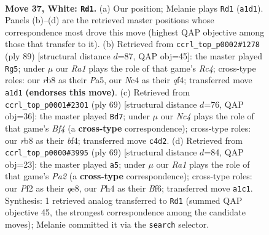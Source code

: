 \documentclass[11pt]{article}
\begin{document}
\clearpage

\begin{figure}[p]\centering
\begin{subfigure}{0.46\textwidth}\centering
\resizebox{\linewidth}{!}{%
\newchessgame
\chessboard[
  setfen={1r4k1/1r5p/1p6/p7/2NQ3P/8/PP3PP1/R4K2 w - - 11 37},
  showmover=false,
  pgfstyle=straightmove, color=movearrow, markmove={a1-d1}
]}
\caption{}
\end{subfigure}\hfill
\begin{subfigure}{0.46\textwidth}\centering
\resizebox{\linewidth}{!}{%
\newchessgame
\chessboard[
  setfen={6k1/5p2/2p3qp/p1r5/5Q2/1P3R1P/P5P1/7K b - - 21 45},
  showmover=false,
  pgfstyle=straightmove, color=movearrow, markmove={c5-g5}
]}
\caption{}
\end{subfigure}
\\[4pt]
\begin{subfigure}{0.46\textwidth}\centering
\resizebox{\linewidth}{!}{%
\newchessgame
\chessboard[
  setfen={8/1p4pk/6p1/pq3b2/5B2/4R2P/1P3RPK/8 b - - 3 35},
  showmover=false,
  pgfstyle=straightmove, color=movearrow, markmove={f5-d7}
]}
\caption{}
\end{subfigure}\hfill
\begin{subfigure}{0.46\textwidth}\centering
\resizebox{\linewidth}{!}{%
\newchessgame
\chessboard[
  setfen={4Q3/p4p1k/5bpp/8/P7/8/q4rPP/2R3RK b - - 0 35},
  showmover=false,
  pgfstyle=straightmove, color=movearrow, markmove={a7-a5}
]}
\caption{}
\end{subfigure}
\caption{\textbf{Move 37, White: \texttt{Rd1}.} (a) Our position; Melanie plays \texttt{Rd1} (\texttt{a1d1}). Panels (b)--(d) are the retrieved master positions whose correspondence most drove this move (highest QAP objective among those that transfer to it). (b) Retrieved from \texttt{ccrl\_top\_p0002\#1278} (ply 89) [structural distance $d$=87, QAP obj=45]: the master played \texttt{Rg5}; under $\mu$ our \emph{Ra1} plays the role of that game's \emph{Rc4}; cross-type roles: our \emph{r}b8 as their \emph{P}a5, our \emph{N}c4 as their \emph{q}f4; transferred move \texttt{a1d1} \textbf{(endorses this move)}. (c) Retrieved from \texttt{ccrl\_top\_p0001\#2301} (ply 69) [structural distance $d$=76, QAP obj=36]: the master played \texttt{Bd7}; under $\mu$ our \emph{Nc4} plays the role of that game's \emph{Bf4} (a \textbf{cross-type} correspondence); cross-type roles: our \emph{r}b8 as their \emph{b}f4; transferred move \texttt{c4d2}. (d) Retrieved from \texttt{ccrl\_top\_p0000\#3995} (ply 69) [structural distance $d$=84, QAP obj=23]: the master played \texttt{a5}; under $\mu$ our \emph{Ra1} plays the role of that game's \emph{Pa2} (a \textbf{cross-type} correspondence); cross-type roles: our \emph{P}f2 as their \emph{q}e8, our \emph{P}h4 as their \emph{B}f6; transferred move \texttt{a1c1}. Synthesis: 1 retrieved analog transferred to \texttt{Rd1} (summed QAP objective 45, the strongest correspondence among the candidate moves); Melanie committed it via the \texttt{search} selector.}
\label{fig:thought-m72}
\end{figure}
\end{document}

